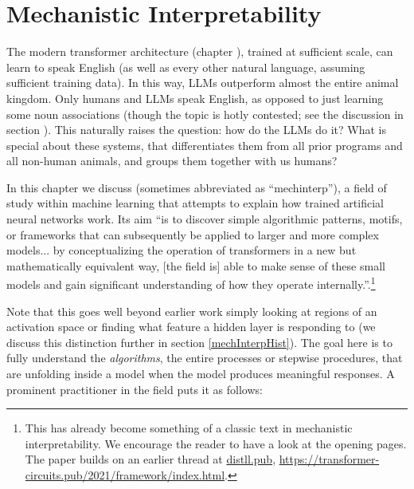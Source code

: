 \chapter{Mechanistic Interpretability}\label{ch_mechinterp}


The modern transformer architecture (chapter ), trained
at sufficient scale, can learn to speak English (as well as every other natural
language, assuming sufficient training data). In this way, LLMs outperform
almost the entire animal kingdom. Only humans and LLMs speak English, as
opposed to just learning some noun associations (though the topic is hotly
contested; see the discussion in section ). This
naturally raises the question: how do the LLMs do it? What is special about
these systems, that differentiates them from all prior programs and all
non-human animals, and groups them together with us humans?

In this chapter we discuss  (sometimes
abbreviated as ``mechinterp''), a field of study within machine learning that
attempts to explain how trained artificial neural networks work. Its aim ``is
to discover simple algorithmic patterns, motifs, or frameworks that can
subsequently be applied to larger and more complex models... by conceptualizing
the operation of transformers in a new but mathematically equivalent way,
[the field is] able to make sense of these small models and
gain significant understanding of how they operate
internally.''\cite{elhage2021mathematical}.\footnote{This has already become
something of a classic text in mechanistic interpretability. We encourage the reader to have a
look at the opening pages. The paper builds on an earlier thread at
\url{distll.pub},
\url{https://transformer-circuits.pub/2021/framework/index.html}.} 

Note that this goes well beyond earlier work simply looking at regions of an
activation space or finding what feature a hidden layer is responding to (we
discuss this distinction further in section \ref{mechInterpHist}). The goal
here is to fully understand the \emph{algorithms}, the entire processes or
stepwise procedures, that are unfolding inside a model when the model produces
meaningful responses. A prominent practitioner in the field puts it as follows:

